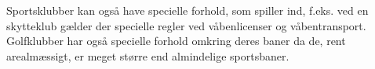 Sportsklubber kan også have specielle forhold, som spiller ind, f.eks. ved en skytteklub gælder der specielle regler ved våbenlicenser og våbentransport. Golfklubber har også specielle forhold omkring deres baner da de, rent arealmæssigt, er meget større end almindelige sportsbaner. 











